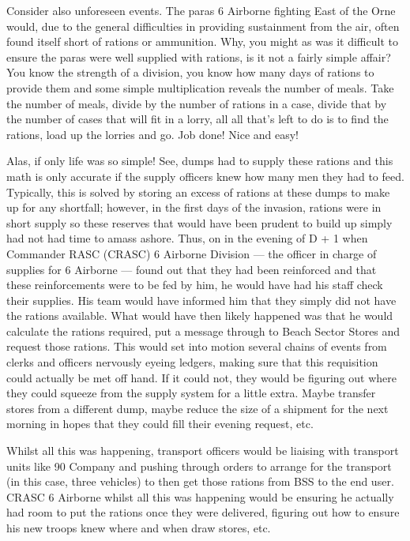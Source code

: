 \documentclass[noraggedright]{turabian-researchpaper}
\begin{document}
Consider also unforeseen events.  The paras 6 Airborne fighting East of the 
Orne would, due to the general difficulties in providing sustainment from 
the air, often found itself short of rations or ammunition.  Why, you might as
was it difficult to ensure the paras were well supplied with rations, is it 
not a fairly simple affair?  You know the strength of a division, you know how
many days of rations to provide them and some simple multiplication reveals
the number of meals.  Take the number of meals, divide by the number of 
rations in a case, divide that by the number of cases that will fit in a 
lorry, all all that's left to do is to find the rations, load up the lorries 
and go.  Job done!  Nice and easy!

Alas, if only life was so simple!  See, dumps had to supply these rations
and this math is only accurate if the supply officers knew how many men they
had to feed.  Typically, this is solved by storing an excess of rations at 
these dumps to make up for any shortfall; however, in the first days of the
invasion, rations were in short supply so these reserves that would have 
been prudent to build up simply had not had time to amass ashore.  Thus, on
in the evening of D + 1 when Commander RASC (CRASC) 6 Airborne Division --- 
the officer in charge of supplies for 6 Airborne
--- found out that they had been reinforced and that these reinforcements 
were to be fed by him, he would have had his staff check their supplies.  
His team would have informed him that they simply did not have the rations 
available.\autocite[6]{90wdjun}
  What would have then likely happened was that he would calculate 
the rations required, put a message through to Beach Sector Stores and request 
those rations.  This would set into motion several chains of events from 
clerks and officers nervously eyeing ledgers, making sure that this requisition
could actually be met off hand.  If it could not, they would be figuring out 
where they could squeeze from the supply system for a little extra.  Maybe
transfer stores from a different dump, maybe reduce the size of a shipment for
the next morning in hopes that they could fill their evening request, etc.  

Whilst all this was happening, transport officers would be liaising with 
transport units like 90 Company and pushing through orders to arrange for 
the transport (in this case, three vehicles) to then get those rations from
BSS to the end user.  CRASC 6 Airborne whilst all this was happening would be
ensuring he actually had room to put the rations once they were delivered, 
figuring out how to ensure his new troops knew where and when draw stores,
etc.  
\end{document}
